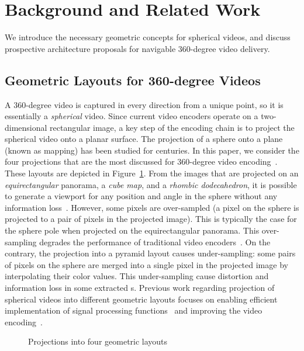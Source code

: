 \section{Background and Related Work}
\label{sec:related}

We introduce the necessary geometric concepts for spherical
videos, and discuss prospective architecture
proposals for navigable $360$-degree video delivery.

\subsection{Geometric Layouts for 360-degree Videos}

A $360$-degree video is captured in every direction from a unique point,
so it is essentially a \emph{spherical} video. Since current video encoders
operate on a two-dimensional rectangular image, a key step of the
encoding chain is to project the spherical video onto a planar
surface. The projection of a sphere onto a plane (known as mapping)
has been studied for centuries. In this paper, we consider the four
projections that are the most discussed for $360$-degree video
encoding~\cite{yu_framework_2015}. These layouts are depicted in
Figure~\ref{fig:mapping}.
From the images that are projected on an \textit{equirectangular}
panorama, a \textit{cube map}, and a \textit{rhombic dodecahedron}, it
is possible to generate a viewport for any position and angle in the
sphere without any information loss~\cite{Ng2005, fu_rhombic_2009}.
However, some pixels are over-sampled (a pixel on the sphere is
projected to a pair of pixels in the projected image). This is
typically the case for the sphere pole when projected on the
equirectangular panorama. This over-sampling degrades the performance
of traditional video encoders~\cite{
yu_framework_2015}. On the contrary, the projection into a pyramid
layout causes under-sampling: some pairs of pixels on the sphere
are merged into a
single pixel in the projected image by interpolating their color
values. This under-sampling cause distortion and information loss in
some extracted \FoV{}s. Previous work regarding projection of spherical
videos into different geometric layouts focuses on enabling efficient
implementation of signal processing
functions~\cite{kazhdan_metric-aware_2010} and improving the video
encoding~\cite{tosic_low_2009}.


\begin{figure}[t]
\centering

\caption{Projections into four geometric layouts}\label{fig:mapping}
\end{figure}


